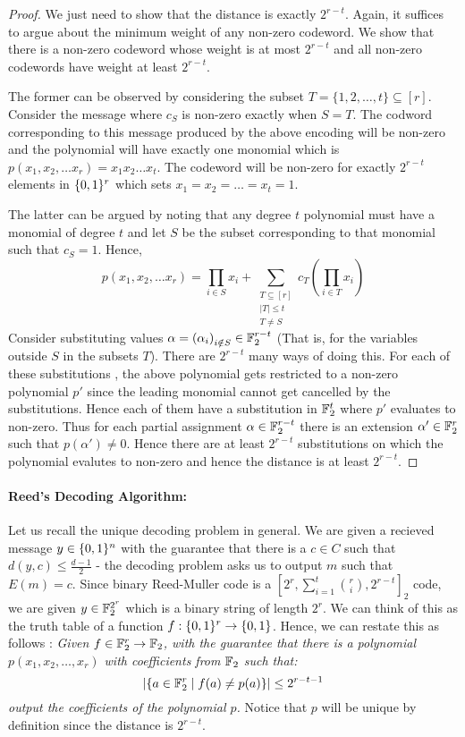 \begin{proof}
We just need to show that the distance is exactly $2^{r-t}$. Again, it suffices to argue about the minimum weight of any non-zero codeword. We show that there is a non-zero codeword whose weight is at most $2^{r-t}$ and all non-zero codewords have weight at least $2^{r-t}$. 

The former can be observed by considering the subset $T=\{1,2,\ldots, t\} \subseteq [r]$. Consider the message where $c_S$ is non-zero exactly when $S=T$. The codword corresponding to this message produced by the above encoding will be non-zero and the polynomial will have exactly one monomial which is $p(x_1, x_2, \ldots x_r) = x_1x_2\ldots x_t$. The codeword will be non-zero for exactly $2^{r-t}$ elements in $\{0,1\}^r$ which sets $x_1 = x_2 = \ldots = x_t = 1$. 

The latter can be argued by noting that any degree $t$ polynomial must have a monomial of degree $t$ and let $S$ be the subset corresponding to that monomial such that $c_S=1$. Hence, $$ p(x_1, x_2, \ldots x_r) = \prod_{i \in S} x_i + \sum_{\substack{T \subseteq [r]\\ |T| \le t \\ T \ne S}} c_T \left( \prod_{i \in T} x_i \right)$$
Consider substituting values $\alpha = \left( \alpha_i \right)_{i \notin S} \in {\mathbb{F}}_2^{r-t}$ (That is, for the variables outside $S$ in the subsets $T$). There are $2^{r-t}$ many ways of doing this. For each of these substitutions , the above polynomial gets restricted to a non-zero polynomial $p'$ since the leading monomial cannot get cancelled by the substitutions. Hence each of them have a substitution in ${\mathbb{F}}_2^{t}$ where $p'$ evaluates to non-zero. Thus for each partial assignment $\alpha \in{\mathbb{F}}_2^{r-t}$ there is an extension $\alpha' \in {\mathbb{F}}_2^r$ such that $p(\alpha') \ne 0$. Hence there are at least $2^{r-t}$ substitutions on which the polynomial evalutes to non-zero and hence the distance is at least $2^{r-t}$.
\end{proof}

\paragraph{Reed's Decoding Algorithm:} Let us recall the unique decoding problem in general. We are given a recieved message $y \in \{0,1\}^n$ with the guarantee that there is a $c \in C$ such that $d(y,c) \le \frac{d-1}{2}$ - the decoding problem asks us to output $m$ such that $E(m) = c$. Since binary Reed-Muller code is a $\left[2^r,\sum_{i=1}^t {r \choose i},2^{r-t}\right]_2$ code, we are given $y \in {\mathbb{F}}_2^{2^r}$ which is a binary string of length $2^r$. We can think of this as the truth table of a function $f : \{0,1\}^r \to \{0,1\}$. Hence, we can restate this as follows : {\em Given $f \in {\mathbb{F}}_2^r \to {\mathbb{F}}_2$, with the guarantee that there is a polynomial $p(x_1,x_2, \ldots, x_r)$ with coefficients from ${\mathbb{F}}_2$ such that:
$${\left| \{a \in {\mathbb{F}}_2^r \mid f(a) \ne p(a) \} \right|}\le 2^{r-t-1}$$
output the coefficients of the polynomial $p$.} Notice that $p$ will be unique by definition since the distance is $2^{r-t}$.

